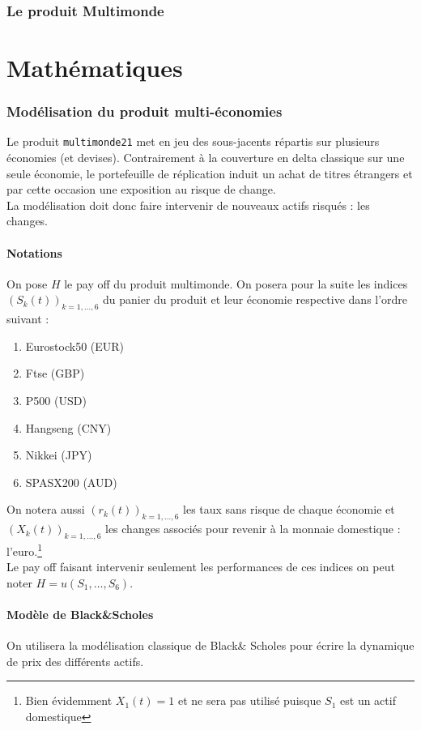 \documentclass[a4paper,12pt]{article}
\begin{document}
 \section{Le produit Multimonde}
 \newpage
\part{Mathématiques}
\section{Modélisation du produit multi-économies}
Le produit {\tt multimonde21} met en jeu des sous-jacents répartis sur plusieurs économies (et devises). Contrairement à la couverture en delta classique sur une seule économie, le portefeuille de réplication induit un achat de titres étrangers et par cette occasion une exposition au risque de change. \\
La modélisation doit donc faire intervenir de nouveaux actifs risqués : les changes.
\subsection{Notations}
On pose $H$ le pay off du produit multimonde.
On posera pour la suite les indices $(S_k(t))_{k=1,\ldots,6}$ du panier du produit et leur économie respective dans l'ordre suivant : 
\begin{enumerate}
\item Eurostock50 (EUR)
\item Ftse (GBP)
\item P500 (USD)
\item Hangseng (CNY)
\item Nikkei (JPY)
\item SPASX200 (AUD)
\end{enumerate}
On notera aussi $(r_k(t))_{k=1,\ldots,6}$ les taux sans risque de chaque économie et $(X_k(t))_{k=1,\ldots,6}$ les changes associés pour revenir à la monnaie domestique : l'euro.\footnote{Bien évidemment $X_1(t)=1$ et ne sera pas utilisé puisque $S_1$ est un actif domestique} \\[2mm]
Le pay off faisant intervenir seulement les performances de ces indices on peut noter $H=u(S_1,\ldots,S_6)$.
\subsection{Modèle de Black\&Scholes}
On utilisera la modélisation classique de Black\& Scholes pour écrire la dynamique de prix des différents actifs. 
\end{document}
